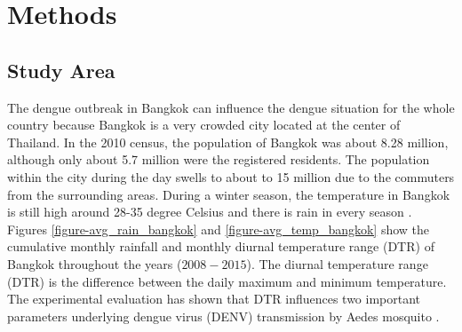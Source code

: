 \documentclass{bmcart}
\begin{document}
%
%
%





% 


%




\section{Methods}



\subsection{Study Area}


The dengue outbreak in Bangkok can influence the dengue situation for the whole country because Bangkok is a very crowded city located at the center of Thailand. In the 2010 census, the population of Bangkok was about 8.28 million, although only about 5.7 million were the registered residents. The population within the city during the day swells to about to 15 million \cite{WPR2015} due to the commuters from the surrounding areas. During a winter season, the temperature in Bangkok is still high around 28-35 degree Celsius and there is rain in every season \cite{wwo2012}. Figures \ref{figure-avg_rain_bangkok} and \ref{figure-avg_temp_bangkok} show the cumulative monthly rainfall and monthly diurnal temperature range (DTR) of Bangkok throughout the years ($2008-2015$).  The diurnal temperature range (DTR) is the difference between the daily maximum and minimum temperature. The experimental evaluation has shown that DTR influences two important parameters underlying dengue virus (DENV) transmission by Aedes mosquito \cite{lambrechts2011impact}. 
\end{document}
